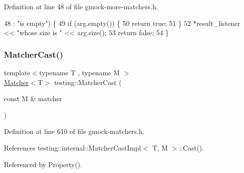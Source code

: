 Definition at line 48 of file gmock-\/more-\/matchers.\+h.


\begin{DoxyCode}
48                                           : \textcolor{stringliteral}{"is empty"}) \{
49   \textcolor{keywordflow}{if} (arg.empty()) \{
50     \textcolor{keywordflow}{return} \textcolor{keyword}{true};
51   \}
52   *result\_listener << \textcolor{stringliteral}{"whose size is "} << arg.size();
53   \textcolor{keywordflow}{return} \textcolor{keyword}{false};
54 \}
\end{DoxyCode}
\mbox{\label{namespacetesting_a8234d15eee99b135a7fdf2141a2ebe1f}} 
\subsubsection{\texorpdfstring{Matcher\+Cast()}{MatcherCast()}}
{\footnotesize\ttfamily template$<$typename T , typename M $>$ \\
\hyperlink{classtesting_1_1Matcher}{Matcher}$<$T$>$ testing\+::\+Matcher\+Cast (\begin{DoxyParamCaption}\item[{const M \&}]{matcher }\end{DoxyParamCaption})\hspace{0.3cm}{\ttfamily [inline]}}



Definition at line 610 of file gmock-\/matchers.\+h.



References testing\+::internal\+::\+Matcher\+Cast\+Impl$<$ T, M $>$\+::\+Cast().



Referenced by Property().


